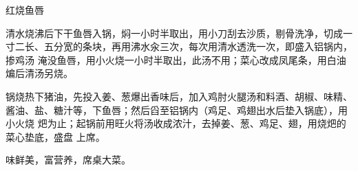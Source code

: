 %
%
%
%
%
%
%
\begin{recipe}{红烧鱼唇}

\ingredients


\preparation

\step 清水烧沸后下干鱼唇入锅，焖一小时半取出，用小刀刮去沙质，剔骨洗净，切成一
寸二长、五分宽的条块，再用沸水汆三次，每次用清水透洗一次，即盛入铝锅内，掺鸡汤
淹没鱼唇，用小火烧一小时半取出，此汤不用；菜心改成凤尾条，用白油煸后清汤另烧。

\step 锅烧热下猪油，先投入姜、葱爆出香味后，加入鸡肘火腿汤和料酒、胡椒、味精、
酱油、盐、糖汁等，下鱼唇；然后舀至铝锅内（鸡足、鸡翅出水后垫入锅底），用小火烧
𤆵为止；起锅前用旺火将汤收成浓汁，去掉姜、葱、鸡足、翅，用烧𤆵的菜心垫底，盛盘
上席。

\features

味鲜美，富营养，席桌大菜。

\end{recipe}

